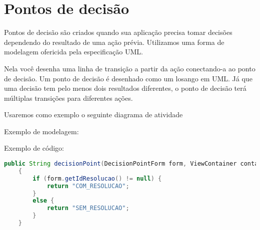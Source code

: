 \section{Pontos de decisão}

Pontos de decisão são criados quando sua aplicação precisa tomar decisões
dependendo do resultado de uma ação prévia. Utilizamos uma forma de modelagem
ofericida pela especificação UML.

Nela você desenha uma linha de transição a partir da ação conectando-a ao ponto
de decisão. Um ponto de decisão é desenhado como um losango em UML. Já que uma
decisão tem pelo menos dois resultados diferentes, o ponto de decisão terá
múltiplas transições para diferentes ações.

Usaremos como exemplo o seguinte diagrama de atividade

Exemplo de modelagem:


Exemplo de código:

\begin{lstlisting}[language=java, frame=single, breaklines=true]
	public String decisionPoint(DecisionPointForm form, ViewContainer container) throws Exception
	{
		if (form.getIdResolucao() != null) {
			return "COM_RESOLUCAO";
		}
		else {
			return "SEM_RESOLUCAO";
		}
	}
\end{lstlisting}